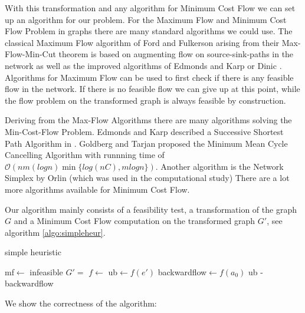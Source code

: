 With this transformation and any algorithm for Minimum Cost Flow we can set up an algorithm for our problem. 
For the Maximum Flow and Minimum Cost Flow Problem in graphs there are many standard algorithms we could use. The 
classical Maximum Flow algorithm of Ford and Fulkerson \cite{Ford-Fulkerson_algo} arising from their Max-Flow-Min-Cut 
theorem is based on augmenting flow on source-sink-paths in the network as well as the improved algorithms of Edmonds 
and Karp \cite{EdmondsKarp1972} or Dinic \cite{Dinic1970}. Algorithms for Maximum Flow can be used to first check if 
there is any feasible flow in the network. If there is no feasible flow we can give up at this point, while the flow 
problem on the transformed graph is always feasible by construction.

Deriving from the Max-Flow Algorithms there are many algorithms solving the Min-Cost-Flow Problem. Edmonds and 
Karp described a Successive Shortest Path Algorithm in \cite{EdmondsKarp1972}. Goldberg and Tarjan proposed the Minimum 
Mean Cycle Cancelling Algorithm \cite{minMeanCycleCancelling89} with runnning time of $\mathcal{O}(nm(log 
n)\min\{log(nC), m log n\}) $. %
Another algorithm is the Network Simplex by Orlin \cite{NetworkSimplexOrlin97} (which was used in the computational 
study) There are a lot more algorithms available for Minimum Cost Flow.

Our algorithm mainly consists of a feasibility test, a transformation of the graph $G$ and a Minimum Cost Flow 
computation on the transformed graph $G'$, see algorithm \ref{algo:simpleheur}. 

\begin{algorithm}
 \caption{simple heuristic}
 \label{algo:simpleheur}
 \begin{algorithmic}
  \State mf$\gets$ 
    \State\Return infeasible
  \EndIf
  \State $G'=$ 
  \State $f\gets$ 
  \State ub$\gets f(e')$
  \State backwardflow$\gets f(a_0)$
  \State \Return ub - backwardflow
  \EndFunction
 \end{algorithmic}
\end{algorithm}

We show the correctness of the algorithm: %

